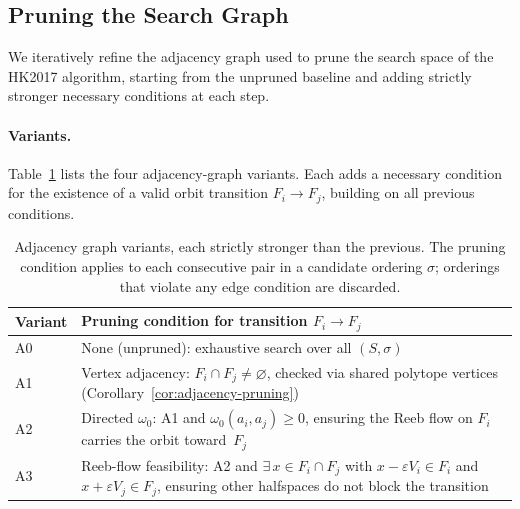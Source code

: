 %
%

\subsection{Pruning the Search Graph}
\label{sec:ablation-pruning}

We iteratively refine the adjacency graph used to prune the search space
of the HK2017 algorithm, starting from the unpruned baseline and adding
strictly stronger necessary conditions at each step.

\paragraph{Variants.}
Table~\ref{tab:ablation-variants} lists the four adjacency-graph variants.
Each adds a necessary condition for the existence of a valid orbit transition
$F_i \to F_j$, building on all previous conditions.

\begin{table}[h]
\centering
\begin{tabular}{lp{9cm}}
\toprule
Variant & Pruning condition for transition $F_i \to F_j$ \\
\midrule
A0 & None (unpruned): exhaustive search over all $(S, \sigma)$ \\
A1 & Vertex adjacency: $F_i \cap F_j \neq \varnothing$, checked via shared polytope vertices (Corollary~\ref{cor:adjacency-pruning}) \\
A2 & Directed $\omega_0$: A1 and $\omega_0(a_i, a_j) \ge 0$, ensuring the Reeb flow on $F_i$ carries the orbit toward~$F_j$ \\
A3 & Reeb-flow feasibility: A2 and $\exists\, x \in F_i \cap F_j$ with $x - \varepsilon V_i \in F_i$ and $x + \varepsilon V_j \in F_j$, ensuring other halfspaces do not block the transition \\
\bottomrule
\end{tabular}
\caption{Adjacency graph variants, each strictly stronger than the previous.
  The pruning condition applies to each consecutive pair in a candidate ordering
  $\sigma$; orderings that violate any edge condition are discarded.}
\label{tab:ablation-variants}
\end{table}

